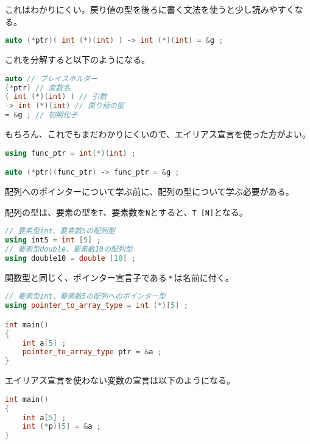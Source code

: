 これはわかりにくい。戻り値の型を後ろに書く文法を使うと少し読みやすくなる。

\begin{lstlisting}[language={C++}]
auto (*ptr)( int (*)(int) ) -> int (*)(int) = &g ;
\end{lstlisting}

これを分解すると以下のようになる。

\begin{lstlisting}[language={C++}]
auto // プレイスホルダー
(*ptr) // 変数名
( int (*)(int) ) // 引数
-> int (*)(int) // 戻り値の型
= &g ; // 初期化子
\end{lstlisting}

もちろん、これでもまだわかりにくいので、エイリアス宣言を使った方がよい。

\begin{lstlisting}[language={C++}]
using func_ptr = int(*)(int) ;

auto (*ptr)(func_ptr) -> func_ptr = &g ;
\end{lstlisting}

\clearpage
{}

配列へのポインターについて学ぶ前に、配列の型について学ぶ必要がある。

配列の型は、要素の型を\texttt{T}、要素数を\texttt{N}とすると、\texttt{T [N]}となる。

\begin{lstlisting}[language={C++}]
// 要素型int、要素数5の配列型
using int5 = int [5] ;
// 要素型double、要素数10の配列型
using double10 = double [10] ;
\end{lstlisting}

関数型と同じく、ポインター宣言子である\,\texttt{*}\,は名前に付く。

\begin{lstlisting}[language={C++}]
// 要素型int、要素数5の配列へのポインター型
using pointer_to_array_type = int (*)[5] ;

int main()
{
    int a[5] ;
    pointer_to_array_type ptr = &a ;
}
\end{lstlisting}

エイリアス宣言を使わない変数の宣言は以下のようになる。

\begin{lstlisting}[language={C++}]
int main()
{
    int a[5] ;
    int (*p)[5] = &a ;
}
\end{lstlisting}

